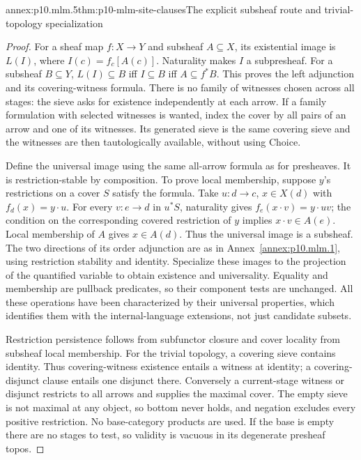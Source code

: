 \begin{annexitem}{annex:p10.mlm.5}{thm:p10-mlm-site-clauses}{The explicit subsheaf route and trivial-topology specialization}
\begin{proof}
For a sheaf map \(f:X\to Y\) and subsheaf \(A\subseteq X\), its existential
image is \(L(I)\), where \(I(c)=f_c[A(c)]\). Naturality makes \(I\) a
subpresheaf. For a subsheaf \(B\subseteq Y\),
\(L(I)\subseteq B\) iff \(I\subseteq B\) iff \(A\subseteq f^*B\).
This proves the left adjunction and its covering-witness formula.
There is no family of witnesses chosen across all stages: the sieve asks
for existence independently at each arrow. If a family formulation with
selected witnesses is wanted, index the cover by all pairs of an arrow and
one of its witnesses. Its generated sieve is the same covering sieve and
the witnesses are then tautologically available, without using Choice.

Define the universal image using the same all-arrow formula as for
presheaves. It is restriction-stable by composition. To prove local
membership, suppose \(y\)'s restrictions on a cover \(S\) satisfy the formula.
Take \(u:d\to c\), \(x\in X(d)\) with \(f_d(x)=y\cdot u\).
For every \(v:e\to d\) in \(u^*S\), naturality gives
\(f_e(x\cdot v)=y\cdot uv\); the condition on the corresponding covered
restriction of \(y\) implies \(x\cdot v\in A(e)\).
Local membership of \(A\) gives \(x\in A(d)\). Thus the universal image is
a subsheaf. The two directions of its order adjunction are as in
Annex~\ref{annex:p10.mlm.1}, using restriction stability and identity.
Specialize these images to the projection of the quantified variable to
obtain existence and universality. Equality and membership are pullback
predicates, so their component tests are unchanged. All these operations
have been characterized by their universal properties, which identifies
them with the internal-language extensions, not just candidate subsets.

Restriction persistence follows from subfunctor closure and cover locality
from subsheaf local membership. For the trivial topology, a covering sieve
contains identity. Thus covering-witness existence entails a witness at
identity; a covering-disjunct clause entails one disjunct there. Conversely
a current-stage witness or disjunct restricts to all arrows and supplies
the maximal cover. The empty sieve is not maximal at any object, so bottom
never holds, and negation excludes every positive restriction.
No base-category products are used. If the base is empty there are no
stages to test, so validity is vacuous in its degenerate presheaf topos.


\end{proof}
\end{annexitem}
